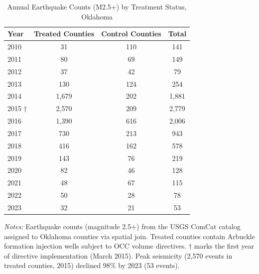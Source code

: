 \begin{table}[htbp]
\centering
\caption{Annual Earthquake Counts (M2.5+) by Treatment Status, Oklahoma}
\label{tab:annual}
\begin{threeparttable}
\begin{tabular}{lccc}
\toprule
Year & Treated Counties & Control Counties & Total \\
\midrule
2010 & 31 & 110 & 141 \\
2011 & 80 & 69 & 149 \\
2012 & 37 & 42 & 79 \\
2013 & 130 & 124 & 254 \\
2014 & 1,679 & 202 & 1,881 \\
\midrule
2015 $\dagger$ & 2,570 & 209 & 2,779 \\
2016 & 1,390 & 616 & 2,006 \\
2017 & 730 & 213 & 943 \\
2018 & 416 & 162 & 578 \\
2019 & 143 & 76 & 219 \\
2020 & 82 & 46 & 128 \\
2021 & 48 & 67 & 115 \\
2022 & 50 & 28 & 78 \\
2023 & 32 & 21 & 53 \\
\bottomrule
\end{tabular}
\begin{tablenotes}[flushleft]
\small
\item \textit{Notes:} Earthquake counts (magnitude 2.5+) from the USGS ComCat catalog assigned to Oklahoma counties via spatial join. Treated counties contain Arbuckle formation injection wells subject to OCC volume directives. $\dagger$ marks the first year of directive implementation (March 2015). Peak seismicity (2,570 events in treated counties, 2015) declined 98\% by 2023 (53 events).
\end{tablenotes}
\end{threeparttable}
\end{table}
